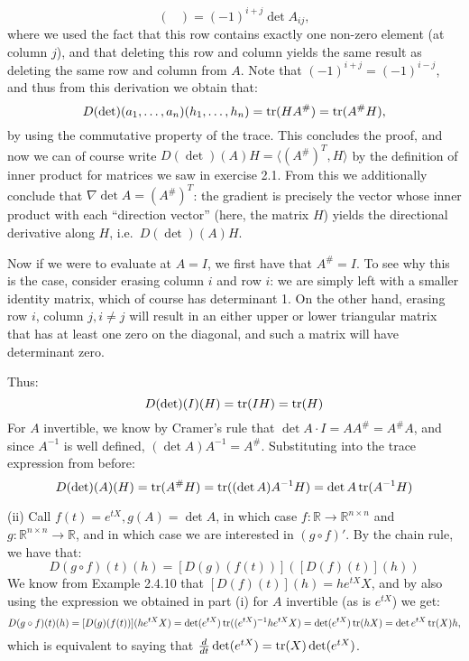 \begin{solution}
$$\begin{pmatrix}
    \end{pmatrix} = (-1)^{i +j} \det A_{ij},$$
    where we used the fact that this row contains exactly one non-zero element (at column $j$), and that deleting this row and column yields the same result as deleting the same row and column from $A$.
    Note that $(-1)^{i + j} = (-1)^{i - j}$, and thus from this derivation we obtain that:
    $$D(\det)(a_1, \ldots, a_n) (h_1, \ldots, h_n) = \operatorname{tr}(H A^{\#}) = \operatorname{tr}(A^{\#}H),$$
    by using the commutative property of the trace.
    This concludes the proof,
    and now we can of course write $D(\det)(A)H = \langle (A^{\#})^{T}, H \rangle$ by the definition of inner product for matrices we saw in exercise 2.1.
    From this we additionally conclude that $\nabla \det A = (A^{\#})^T$: the gradient is precisely the vector whose inner product with each ``direction vector'' (here, the matrix $H$) yields the directional derivative along $H$, i.e.\ $D(\det) (A) H$.

    Now if we were to evaluate at $A = I$, we first have that $A^{\#} = I$.
    To see why this is the case, consider erasing column $i$ and row $i$: we are simply left with a smaller identity matrix, which of course has determinant 1.
    On the other hand, erasing row $i$, column $j, i \neq j$ will result in an either upper or lower triangular matrix that has at least one zero on the diagonal, and such a matrix will have determinant zero.

    Thus:
    $$D(\det)(I)(H) = \operatorname{tr} (I H) = \operatorname{tr}(H)$$
    For $A$ invertible, we know by Cramer's rule that $\det A \cdot I = A A^{\#} = A^{\#} A$, and since $A^{-1}$ is well defined, $(\det A) A^{-1} = A^{\#}$.
    Substituting into the trace expression from before:
    $$D(\det)(A)(H) = \operatorname{tr}(A^{\#}H) = \operatorname{tr}((\det A)A^{-1} H) = \det A \operatorname{tr}(A^{-1}H)$$

    (ii) Call $f(t) = e^{tX}, g(A) = \det A $, in which case $f: \mathbb{R} \rightarrow \mathbb{R}^{n \times n}$ and $g: \mathbb{R}^{n \times n} \rightarrow \mathbb{R}$, and in which case we are interested in $(g \circ f)'$.
    By the chain rule, we have that:
    $$ D (g \circ f) (t) (h) = [D (g) (f(t))]( [D (f) (t)] (h))$$
    We know from Example 2.4.10 that $[D(f)(t)](h) = h e^{tX} X$, and by also using the expression we obtained in part (i) for $A$ invertible (as is $e^{tX}$) we get:
    $$ D (g \circ f) (t) (h) = [D (g) (f(t))](he^{tX}X) = \det(e^{tX}) \operatorname{tr}((e^{tX})^{-1}he^{tX}X) = \det(e^{tX}) \operatorname{tr}(hX) = \det{e^{tX}} \operatorname{tr}(X)h,$$
    which is equivalent to saying that $\frac{d}{dt} \det(e^{tX}) = \operatorname{tr}(X) \det(e^{tX})$.


\end{solution}
